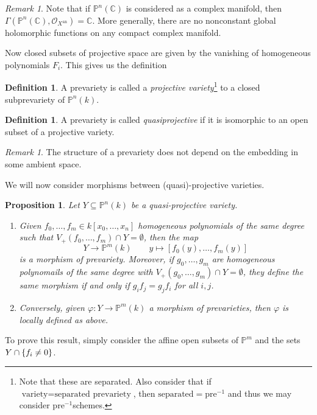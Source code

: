 \documentclass[leqno, openany]{memoir}
\newtheorem{prop}[thm]{Proposition}
\theoremstyle{definition}
\newtheorem{defn}[thm]{Definition}
\theoremstyle{remark}
\newtheorem{rmk}[thm]{Remark}
\theoremstyle{plain}
\theoremstyle{definition}
\theoremstyle{remark}
\newcommand{\C}{\mathbb{C}}
\renewcommand{\P}{\mathbb{P}}
\newcommand{\mc}[1]{\mathcal{#1}}
\newcommand{\mr}[1]{\mathrm{#1}}
\begin{document}
\begin{rmk} Note that if $\P^n(\C)$ is considered as a complex manifold, then
$\Gamma(\P^n(\C), \mc{O}_{X^{\mr{an}}}) = \C$. More generally, there are no
nonconstant global holomorphic functions on any compact complex manifold.
\end{rmk}

Now closed subsets of projective space are given by the vanishing of
homogeneous polynomials $F_i$. This gives us the definition \begin{defn} A
    prevariety is called a \textit{projective variety}\footnote{Note that these
    are separated. Also consider that if $\text{variety} = \text{separated
prevariety}$, then $\text{separated} = \text{pre}^{-1}$ and thus we may
consider $\text{pre}^{-1}$schemes.} to a closed subprevariety of $\P^n(k)$.
\end{defn}

\begin{defn} A prevariety is called \textit{quasiprojective} if it is
isomorphic to an open subset of a projective variety.  \end{defn}

\begin{rmk} The structure of a prevariety does not depend on the embedding in
some ambient space.  \end{rmk}

We will now consider morphisms between (quasi)-projective varieties.

\begin{prop} Let $Y \subseteq \P^n(k)$ be a quasi-projective variety.
    \begin{enumerate} \item Given $f_0, \ldots, f_m \in k[x_0, \ldots, x_n]$
        homogeneous polynomials of the same degree such that $V_+(f_0, \ldots,
        f_m) \cap Y = \emptyset$, then the map \[ Y \to \P^m(k) \qquad y
        \mapsto [f_0(y), \ldots, f_m(y)] \] is a morphism of prevariety.
        Moreover, if $g_0, \ldots, g_m$ are homogeneous polynomails of the same
        degree with $V_+(g_0, \ldots, g_m) \cap Y = \emptyset$, they define the
        same morphism if and only if $g_i f_j = g_j f_i$ for all $i,j$.  \item
Conversely, given $\varphi \colon Y \to \P^m(k)$ a morphism of prevarieties,
then $\varphi$ is locally defined as above.  \end{enumerate} \end{prop}

To prove this result, simply consider the affine open subsets of $\P^m$ and the
sets $Y \cap \qty{f_i \neq 0}$.
\end{document}
